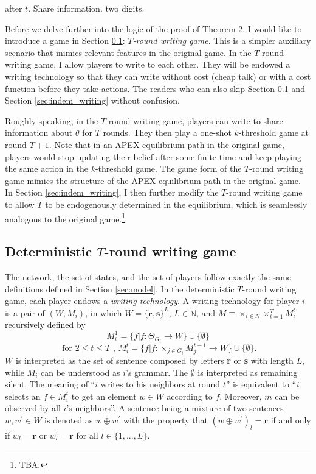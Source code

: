 \documentclass[12pt,letter]{article}
\theoremstyle{definition}
\theoremstyle{remark}
\theoremstyle{claim}
\begin{document}
after $t$. Share information. two digits.

Before we delve further into the logic of the proof of Theorem 2, I would like to introduce a game in Section \ref{sec:writing}: \textit{$T$-round writing game}. This is a simpler auxiliary scenario that mimics relevant features in the original game. In the $T$-round writing game, I allow players to write to each other. They will be endowed a writing technology so that they can write without cost (cheap talk) or with a cost function before they take actions. The readers who can also skip Section \ref{sec:writing} and Section \ref{sec:indem_writing} without confusion.
 

Roughly speaking, in the $T$-round writing game, players can write to share information about $\theta$ for $T$ rounds. They then play a one-shot $k$-threshold game at round $T+1$. Note that in an APEX equilibrium path in the original game, players would stop updating their belief after some finite time and keep playing the same action in the $k$-threshold game. The game form of the $T$-round writing game mimics the structure of the APEX equilibrium path in the original game. In Section \ref{sec:indem_writing}, I then further modify the $T$-round writing game to allow $T$ to be endogenously determined in the equilibrium, which is seamlessly analogous to the original game.\footnote{TBA.}  

  

\subsection{Deterministic $T$-round writing game}
\label{sec:writing}
The network, the set of states, and the set of players follow exactly the same definitions defined in Section \ref{sec:model}. In the deterministic $T$-round writing game, each player endows a \textit{writing technology}. A writing technology for player $i$ is a pair of $(W,M_i)$, in which $W=\{{\textbf{r}},\textbf{s}\}^L$, $L\in \mathbb{N}$, and $M\equiv \times_{i\in N}\times^T_{t=1}M^{t}_i$ recursively defined by
\[M^1_i=\{f|f:\Theta_{G_i}\rightarrow W\}\cup \{\emptyset\}\]
\[ \text{ for } 2\leq t \leq T\text{ , }M^{t}_i=\{f|f:\times_{j\in G_i}M^{t-1}_j\rightarrow W\}\cup \{\emptyset\}. \]
$W$ is interpreted as the set of sentence composed by letters \textbf{r} or \textbf{s} with length $L$, while $M_i$ can be understood as $i$'s grammar. The $\emptyset$ is interpreted as remaining silent. The meaning of ``$i$ writes to his neighbors at round $t$'' is equivalent to ``$i$ selects an $f\in M^t_i$ to get an element $w\in W$ according to $f$.  Moreover, $m$ can be observed by all $i$'s neighbors''. A sentence being a mixture of two sentences $w,w^{'}\in W$ is denoted as $w\oplus w^{'}$ with the property that $(w\oplus w^{'})_l=\textbf{r}$ if and only if $w_l=\textbf{r}$ or $w^{'}_l=\textbf{r}$ for all $l\in \{1,...,L\}$. 
\end{document}
